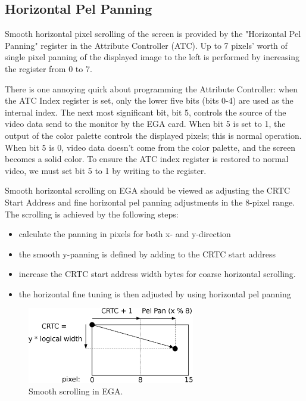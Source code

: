 \documentclass[book.tex]{subfiles}
\begin{document}
\subsection{Horizontal Pel Panning}
Smooth horizontal pixel scrolling of the screen is provided by the "Horizontal Pel Panning" register in the Attribute Controller (ATC). Up to 7 pixels' worth of single pixel panning of the displayed image to the left is performed by increasing the register from 0 to 7. \\
\par

There is one annoying quirk about programming the Attribute Controller: when the ATC Index register is set, only the lower five bits (bits 0-4) are used as the internal index. The next most significant bit, bit 5, controls the source of the video data send to the monitor by the EGA card. When bit 5 is set to 1, the output of the color palette controls the displayed pixels; this is normal operation. When bit 5 is 0, video data doesn't come from the color palette, and the screen becomes a solid color. To ensure the ATC index register is restored to normal video, we must set bit 5 to 1 by writing  to the register.\\ 

\begin{minipage}{\textwidth}
  
  \end{minipage}
  \label{ega_pel_pan}
  \par


Smooth horizontal scrolling on EGA should be viewed as adjusting the CRTC Start Address and fine horizontal pel panning adjustments in the 8-pixel range. The scrolling is achieved by the following steps:
\begin{itemize}
  \item calculate the panning in pixels for both x- and y-direction
  \item the smooth y-panning is defined by adding  to the CRTC start address
  \item increase the CRTC start address width  bytes for coarse horizontal scrolling.
  \item the horizontal fine tuning is then adjusted by  using horizontal pel panning
\end{itemize}




\begin{figure}[H]
\centering
\includegraphics[width=0.65\textwidth]{imgs/drawings/Tile_Refresh.eps}
\caption{Smooth scrolling in EGA.}
\label{fig:tile_refresh}
\end{figure}
\end{document}
